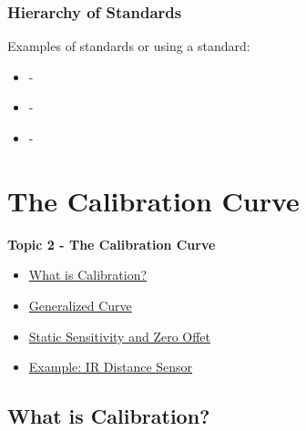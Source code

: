 \documentclass[fleqn]{ltx-talk} %
\newcommand{\sectionIItitle}{The Calibration Curve}
\newcommand{\sectionIsubsectionIVtitle}{Hierarchy of Standards}
\newcommand{\sectionIIsubsectionItitle}{What is Calibration?}
\newcommand{\sectionIIsubsectionIItitle}{Generalized Curve}
\newcommand{\sectionIIsubsectionIIItitle}{Static Sensitivity and Zero Offet}
\newcommand{\sectionIIsubsectionIVtitle}{Example: IR Distance Sensor}
\begin{document}
			\begin{frame}
				\frametitle{\sectionIsubsectionIVtitle}

\bigskip
Examples of standards or using a standard:
\begin{itemize}
  \item -
  \item -
  \item -
\end{itemize}



			\end{frame}

	
	\section{\sectionIItitle}\label{sectionII}

		\begin{frame}
			\large \textbf{Topic 2 - \sectionIItitle} \vspace{3mm}\\

			\begin{itemize}
				\item \hyperref[sectionIIsubsectionI]{\sectionIIsubsectionItitle} \vspc %
				\item \hyperref[sectionIIsubsectionII]{\sectionIIsubsectionIItitle} \vspc %
				\item \hyperref[sectionIIsubsectionIII]{\sectionIIsubsectionIIItitle} \vspc %
				\item \hyperref[sectionIIsubsectionIV]{\sectionIIsubsectionIVtitle} \vspc %
			\end{itemize}

		\end{frame}

		\subsection{\sectionIIsubsectionItitle}\label{sectionIIsubsectionI}
\end{document}
